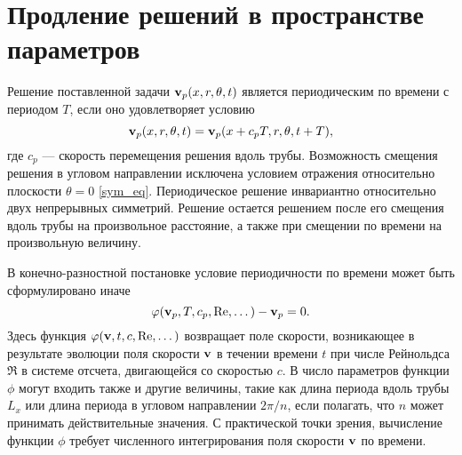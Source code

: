 \begin{comment}
На каждом шаге метода Ньютона-Рафсона возникает необходимость решения матрицы Якоби. В случае задач вычислительной гидродинамики, где число неизвестных достигает миллионов, формирование и даже хранение матрицы Якоби в явном виде невозможно, так как число элементов в ней составляет квадрат числа неизвестных в уравнении. Используя Крыловские методы для решения матрицы Якоби удается радикальным образом сократить число операций и необходимой оперативной памяти, что делает расчеты возможными. В работе реализован метод Ньютона-Крылова \cite{}, основанный на методе GMRES (generalized minimum residual method) \cite{Saad1986}. Альтернативой методу GMRES может быть метод BiCGSTAB (Biconjugate gradient stabilized method) \cite{Sleijpen1993}. 

В континуальной постановке не формулируется. 
\end{comment}

\section{Продление решений в пространстве параметров}

Решение поставленной задачи $\mathbf{v}_p(x,r,\theta,t)$ является периодическим по времени с периодом $T$, если оно удовлетворяет условию
\begin{equation} \label{tper_eq}
\mathbf{v}_p(x,r,\theta,t) = \mathbf{v}_p(x + c_p T, r, \theta, t + T),
\end{equation}
где $c_p$ --- скорость перемещения решения вдоль трубы. Возможность смещения решения в угловом направлении исключена условием отражения относительно плоскости $\theta = 0$ \eqref{sym_eq}. Периодическое решение инвариантно относительно двух непрерывных симметрий. Решение остается решением после его смещения вдоль трубы на произвольное расстояние, а также при смещении по времени на произвольную величину. 

В конечно-разностной постановке условие периодичности по времени может быть сформулировано иначе
\begin{equation}\label{P_eq}
\varphi(\mathbf{v}_p, T, c_p, \operatorname{Re}, \dots) - \mathbf{v}_p = 0.
\end{equation}
Здесь функция $\varphi(\mathbf{v}, t, c, \operatorname{Re}, \dots)$ возвращает поле скорости, возникающее в результате эволюции поля скорости $\mathbf{v}$ в течении времени $t$ при числе Рейнольдса $\Re$ в системе отсчета, двигающейся со скоростью $c$. В число параметров функции $\phi$ могут входить также и другие величины, такие как длина периода вдоль трубы $L_x$ или длина периода в угловом направлении $2\pi/n$, если полагать, что $n$ может принимать действительные значения. С практической точки зрения, вычисление функции $\phi$ требует численного интегрирования поля скорости $\mathbf{v}$ по времени. 

